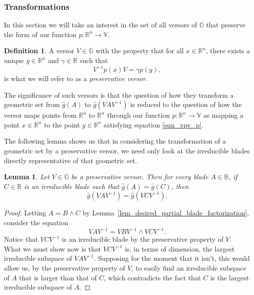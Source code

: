 \documentclass{birkjour}
\newtheorem{lem}[thm]{Lemma}
\theoremstyle{definition}
\newtheorem{defn}[thm]{Definition}
\theoremstyle{remark}
\numberwithin{equation}{section}
\newcommand{\R}{\mathbb{R}}
\newcommand{\B}{\mathbb{B}}
\newcommand{\G}{\mathbb{G}}
\newcommand{\V}{\mathbb{V}}
\newcommand{\gh}{\hat{g}}
\begin{document}
\subsubsection{Transformations}

In this section we will take an interest in the set of all versors of $\G$ that preserve the form
of our function $p:\R^n\to\V$.
\begin{defn}
A versor $V\in\G$ with the property that for all $x\in\R^n$, there exists a unique $y\in\R^n$ and
$\gamma\in\R$ such that
\begin{equation}\label{equ_vpv_p}
V^{-1}p(x)V = \gamma p(y),
\end{equation}
is what we will refer to as a {\it preservative versor}.
\end{defn}

The significance of such versors is that the question of how they transform a geometric set
from $\gh(A)$ to $\gh(VAV^{-1})$ is reduced to the question
of how the versor maps points from $\R^n$ to $\R^n$ through our function $p:\R^n\to\V$
as mapping a point $x\in\R^n$ to the point $y\in\R^n$ satisfying equation \eqref{equ_vpv_p}.

The following lemma shows us that in considering the transformation of a geometric set
by a preservative versor, we need only look at the irreducible blades directly representative of that geometric set.

\begin{lem}
Let $V\in\G$ be a preservative versor.
Then for every blade $A\in\B$, if $C\in\B$ is an irreducible blade such that $\gh(A)=\gh(C)$, then
\begin{equation}\label{equ_transformed_reducible_is_transformed_irreducible}
\gh(VAV^{-1})=\gh(VCV^{-1}).
\end{equation}
\end{lem}
\begin{proof}
Letting $A=B\wedge C$ by Lemma~\ref{lem_desired_partial_blade_factorization}, consider the equation
\begin{equation}
VAV^{-1} = VBV^{-1}\wedge VCV^{-1}.
\end{equation}
Notice that $VCV^{-1}$ is an irreducible blade by the preservative property of $V$.
What we must show now is
that $VCV^{-1}$ is, in terms of dimension, the largest irreducible subspace of $VAV^{-1}$.  Supposing for the moment that it isn't,
this would allow us, by the preservative property of $V$, to easily find an irreducible subspace of $A$ that is larger than that of $C$,
which contradicts the fact that $C$ is the largest irreducible subspace of $A$.
\end{proof}
\end{document}
